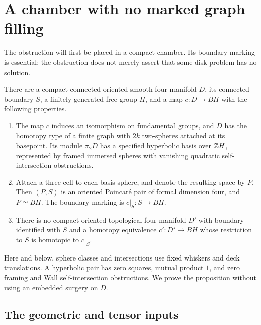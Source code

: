 \section{A chamber with no marked graph filling}
\label{ch:section}

The obstruction will first be placed in a compact chamber.  Its boundary
marking is essential: the obstruction does not merely assert that some
disk problem has no solution.

\begin{proposition}
\label{ch:chamber}
There are a compact connected oriented smooth four-manifold $D$, its
connected boundary $S$, a finitely generated free group $H$, and a map
$c:D\to BH$ with the following properties.
\begin{enumerate}
\item The map $c$ induces an isomorphism on fundamental groups, and $D$
has the homotopy type of a finite graph with $2k$ two-spheres attached
at its basepoint.  Its module $\pi_2D$ has a specified hyperbolic basis
over $\mathbb Z H$, represented by framed immersed spheres with vanishing
quadratic self-intersection obstructions.
\item Attach a three-cell to each basis sphere, and denote the resulting
space by $P$.  Then $(P,S)$ is an oriented Poincar\'e pair of formal
dimension four, and $P\simeq BH$.  The boundary marking is
$c|_S:S\to BH$.
\item There is no compact oriented topological four-manifold $D'$ with
boundary identified with $S$ and a homotopy equivalence $c':D'\to BH$
whose restriction to $S$ is homotopic to $c|_S$.
\end{enumerate}
\end{proposition}

Here and below, sphere classes and intersections use fixed whiskers and
deck translations.  A hyperbolic pair has zero squares, mutual product
$1$, and zero framing and Wall self-intersection obstructions.  We prove
the proposition without using an embedded surgery on $D$.

\subsection{The geometric and tensor inputs}
\label{ch:inputs}


